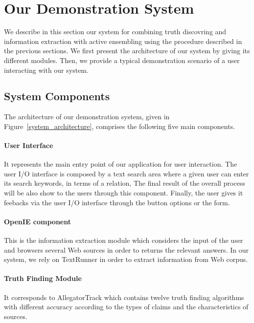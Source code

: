\section{Our Demonstration System}\label{demonstration}
We describe in this section our system for 
combining truth discovring and information
extraction with active ensembling using the procedure described
in the previous sections. We first 
present the architecture of our system by
giving its different modules. Then, we provide
a typical demonstration scenario of a user interacting
with our system.


\subsection{System Components}
The architecture of our demonstration system, given in
Figure~\ref{system_architecture}, comprises the following
five main components.

\paragraph*{User Interface}It represents the main entry point
of our application for user interaction. The user I/O interface is
composed by a text search area where a given user can enter its 
search keywords, in terms of a relation, The final result of the 
overall process will be also show to the users through this component.
Finally, the user gives it feebacks via the user I/O interface through
the button options or the form.

\paragraph*{OpenIE component} This is the information 
extraction module which considers the input of the user and browsers
several Web sources in order to returns the relevant answers. In our 
system, we rely on TextRunner in order to extract information from Web corpus.

\paragraph*{Truth Finding Module} It corresponds to AllegatorTrack which contains
twelve truth finding algorithms with different accuracy according to the types of 
claims and the characteristics of sources.

